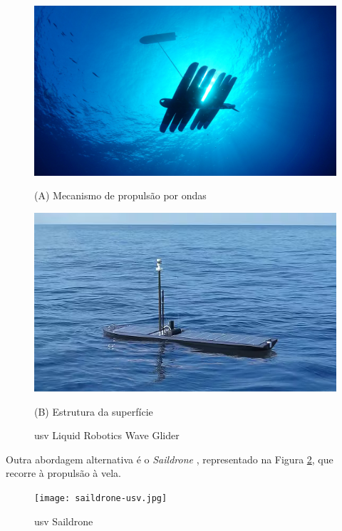 \begin{figure}[H]
    \centering
    \begin{minipage}{0.45\linewidth}
        \centering
        \includegraphics[width=\linewidth]{figuras/wave-glider.jpg}
        \caption*{(A) Mecanismo de propulsão por ondas}
    \end{minipage}
    \hfill
    \begin{minipage}{0.45\linewidth}
        \centering
        \includegraphics[width=\linewidth]{figuras/wave-glider2.png}
        \caption*{(B) Estrutura da superfície}
    \end{minipage}
    \caption[\gls{usv} Liquid Robotics Wave Glider]{\gls{usv} Liquid Robotics Wave Glider \cite{wave-glider}}
    \label{fig:wave-glider}
\end{figure}

Outra abordagem alternativa é o \emph{Saildrone} \cite{saildrone}, representado na Figura \ref{fig:saildrone}, que recorre à propulsão à vela. 

\begin{figure}[H]
    \centering
    \texttt{[image: saildrone-usv.jpg]}
    \caption[\gls{usv} Saildrone]{\gls{usv} Saildrone \cite{saildrone}}
    \label{fig:saildrone}
\end{figure}

